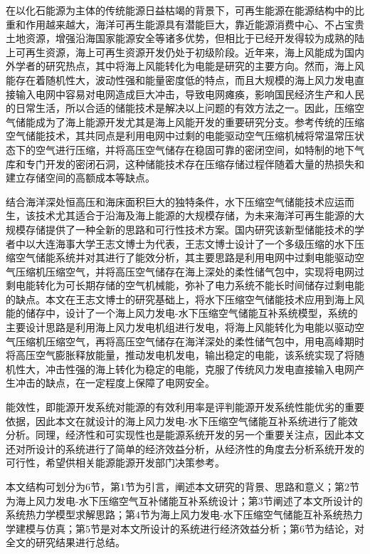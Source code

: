 \documentclass{jnuthesis}
\begin{document}
	\par 在以化石能源为主体的传统能源日益枯竭的背景下，可再生能源在能源结构中的比重和作用越来越大，海洋可再生能源具有潜能巨大，靠近能源消费中心、不占宝贵土地资源，增强沿海国家能源安全等诸多优势，但相比于已经开发得较为成熟的陆上可再生资源，海上可再生资源开发仍处于初级阶段。近年来，海上风能成为国内外学者的研究热点，其中将海上风能转化为电能是研究的主要方向。然而，海上风能存在着随机性大，波动性强和能量密度低的特点，而且大规模的海上风力发电直接输入电网中容易对电网造成巨大冲击，导致电网瘫痪，影响国民经济生产和人民的日常生活，所以合适的储能技术是解决以上问题的有效方法之一。因此，压缩空气储能成为了海上能源开发尤其是海上风能开发的重要研究分支。参考传统的压缩空气储能技术，其共同点是利用电网中过剩的电能驱动空气压缩机械将常温常压状态下的空气进行压缩，并将高压空气储存在稳固可靠的密闭空间，如特制的地下气库和专门开发的密闭石洞，这种储能技术存在压缩存储过程伴随着大量的热损失和建立存储空间的高额成本等缺点。
	\par 结合海洋深处恒高压和海床面积巨大的独特条件，水下压缩空气储能技术应运而生，该技术尤其适合于沿海及海上能源的大规模存储，为未来海洋可再生能源的大规模存储提供了一种全新的思路和可行性技术方案。国内研究该新型储能技术的学者中以大连海事大学王志文博士为代表，王志文博士设计了一个多级压缩的水下压缩空气储能系统并对其进行了能效分析，其主要思路是利用电网中过剩电能驱动空气压缩机压缩空气，并将高压空气储存在海上深处的柔性储气包中，实现将电网过剩电能转化为可长期存储的空气机械能，弥补了电力系统不能长时间储存过剩电能的缺点。本文在王志文博士的研究基础上，将水下压缩空气储能技术应用到海上风能的储存中，设计了一个海上风力发电-水下压缩空气储能互补系统模型，系统的主要设计思路是利用海上风力发电机组进行发电，将海上风能转化为电能以驱动空气压缩机压缩空气，再将高压空气储存在海洋深处的柔性储气包中，用电高峰期时将高压空气膨胀释放能量，推动发电机发电，输出稳定的电能，该系统实现了将随机性大，冲击性强的海上转化为稳定的电能，克服了传统风力发电直接输入电网产生冲击的缺点，在一定程度上保障了电网安全。
	\par 能效性，即能源开发系统对能源的有效利用率是评判能源开发系统性能优劣的重要依据，因此本文在就设计的海上风力发电-水下压缩空气储能互补系统进行了能效分析。同理，经济性和可实现性也是能源系统开发的另一个重要关注点，因此本文还对所设计的系统进行了简单的经济效益分析，从经济性的角度去分析系统开发的可行性，希望供相关能源能源开发部门决策参考。
	\par 本文结构可划分为$ 6 $节，第$ 1 $节为引言，阐述本文研究的背景、思路和意义；第$ 2 $节为海上风力发电-水下压缩空气互补储能互补系统设计；第$ 3 $节阐述了本文所设计的系统热力学模型求解思路；第$ 4 $节为海上风力发电-水下压缩空气储能互补系统热力学建模与仿真；第$ 5 $节是对本文所设计的系统进行经济效益分析；第$ 6 $节为结论，对全文的研究结果进行总结。	
	
\end{document}
